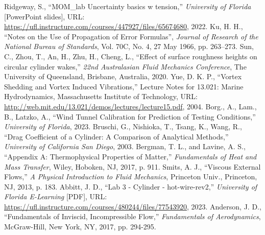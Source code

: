 \documentclass[journal,letterpaper]{IEEEtran}
\begin{document}
\begin{thebibliography}{99}
     Ridgeway, S., ``MOM\_lab Uncertainty basics w tension,'' \textit{University of Florida} [PowerPoint slides], URL: \url{https://ufl.instructure.com/courses/447927/files/65674680}, 2022.
     Ku, H. H., ``Notes on the Use of Propagation of Error Formulas'', \textit{Journal of Research of the National Bureau of Standards}, Vol. 70C, No. 4, 27 May 1966, pp. 263--273.
     Sun, C., Zhou, T., An, H., Zhu, H., Cheng, L., ``Effect of surface roughness heights on circular cylinder wakes,'' \textit{22nd Australasian Fluid Mechanics Conference}, The University of Queensland, Brisbane, Australia, 2020.
     Yue, D. K. P., ``Vortex Shedding and Vortex Induced Vibrations,'' Lecture Notes for 13.021: Marine Hydrodynamics, Massachusetts Institute of Technology, URL: \url{http://web.mit.edu/13.021/demos/lectures/lecture15.pdf}, 2004.
     Borg., A., Lam., B., Latzko, A., ``Wind Tunnel Calibration for Prediction of Testing Conditions,'' \textit{University of Florida}, 2023.
     Bruschi, G., Nishioka, T., Tsang, K., Wang, R., ``Drag Coefficient of a Cylinder: A Comparison of Analytical Methods,'' \textit{University of California San Diego}, 2003.
     Bergman, T. L., and Lavine, A. S., ``Appendix A: Thermophysical Properties of Matter,'' \textit{Fundamentals of Heat and Mass Transfer}, Wiley, Hoboken, NJ, 2017, p. 911.
     Smits, A. J., ``Viscous External Flows,'' \textit{A Physical Introduction to Fluid Mechanics}, Princeton Univ., Princeton, NJ, 2013, p. 183.
     Abbitt, J. D., ``Lab 3 - Cylinder - hot-wire-rev2,'' \textit{University of Florida E-Learning} [PDF], URL: \url{https://ufl.instructure.com/courses/480244/files/77543920}, 2023.
     Anderson, J. D., ``Fundamentals of Inviscid, Incompressible Flow,'' \textit{Fundamentals of Aerodynamics}, McGraw-Hill, New York, NY, 2017, pp. 294-295.
\end{thebibliography}
\end{document}
